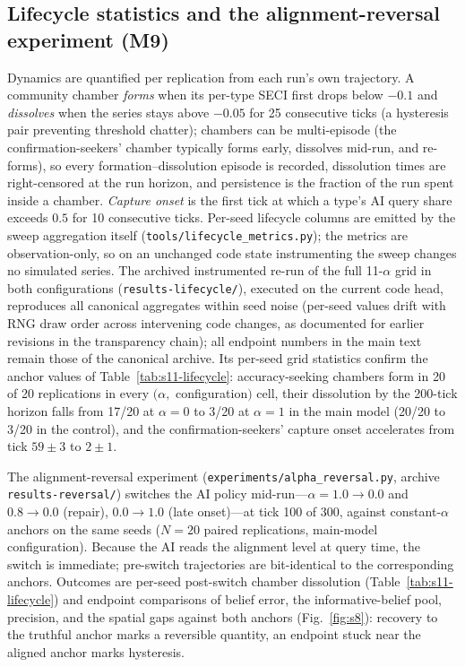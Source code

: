 \documentclass[11pt]{article}
\begin{document}
\subsection{Lifecycle statistics and the alignment-reversal experiment (M9)}
\label{si:lifecycle}
Dynamics are quantified per replication from each run's own trajectory.
A community chamber \emph{forms} when its per-type SECI first drops
below $-0.1$ and \emph{dissolves} when the series stays above $-0.05$
for 25 consecutive ticks (a hysteresis pair preventing threshold
chatter); chambers can be multi-episode (the confirmation-seekers'
chamber typically forms early, dissolves mid-run, and re-forms), so
every formation--dissolution episode is recorded, dissolution times are
right-censored at the run horizon, and persistence is the fraction of
the run spent inside a chamber. \emph{Capture onset} is the first tick
at which a type's AI query share exceeds $0.5$ for 10 consecutive
ticks. Per-seed lifecycle columns are emitted by the sweep aggregation
itself (\texttt{tools/lifecycle\_metrics.py}); the metrics are
observation-only, so on an unchanged code state instrumenting the sweep
changes no simulated series. The archived instrumented re-run of the
full 11-$\alpha$ grid in both configurations
(\texttt{results-lifecycle/}), executed on the current code head,
reproduces all canonical aggregates within seed noise (per-seed values
drift with RNG draw order across intervening code changes, as
documented for earlier revisions in the transparency chain); all
endpoint numbers in the main text remain those of the canonical
archive. Its per-seed grid statistics confirm the anchor values of
Table~\ref{tab:s11-lifecycle}: accuracy-seeking chambers form in 20 of
20 replications in every $(\alpha,$ configuration$)$ cell, their
dissolution by the 200-tick horizon falls from 17/20 at $\alpha = 0$ to
3/20 at $\alpha = 1$ in the main model (20/20 to 3/20 in the control),
and the confirmation-seekers' capture onset accelerates from tick $59
\pm 3$ to $2 \pm 1$.

The alignment-reversal experiment
(\texttt{experiments/alpha\_reversal.py}, archive
\texttt{results-reversal/}) switches the AI policy mid-run---$\alpha =
1.0 \to 0.0$ and $0.8 \to 0.0$ (repair), $0.0 \to 1.0$ (late
onset)---at tick 100 of 300, against constant-$\alpha$ anchors on the
same seeds ($N = 20$ paired replications, main-model configuration).
Because the AI reads the alignment level at query time, the switch is
immediate; pre-switch trajectories are bit-identical to the
corresponding anchors. Outcomes are per-seed post-switch chamber
dissolution (Table~\ref{tab:s11-lifecycle}) and endpoint comparisons of
belief error, the informative-belief pool, precision, and the spatial
gaps against both anchors (Fig.~\ref{fig:s8}): recovery to the
truthful anchor marks a reversible quantity, an endpoint stuck near the
aligned anchor marks hysteresis.
\end{document}
